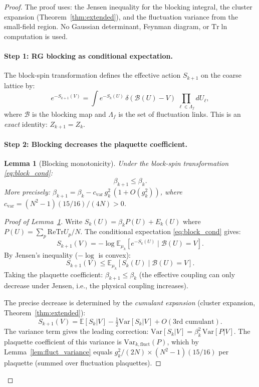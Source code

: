 \documentclass[11pt,a4paper]{amsart}
\newtheorem{lemma}[theorem]{Lemma}
\theoremstyle{definition}
\newcommand{\re}{\mathrm{Re}}
\newcommand{\Tr}{\mathrm{Tr}}
\begin{document}
\begin{proof}
The proof uses: the Jensen inequality for the blocking integral,
the cluster expansion (Theorem~\ref{thm:extended}), and the fluctuation
variance from the small-field region.  No Gaussian determinant, Feynman
diagram, or $\Tr\ln$ computation is used.

\paragraph{Step 1: RG blocking as conditional expectation.}
The block-spin transformation defines the effective action $S_{k+1}$ on the
coarse lattice by:
\begin{equation}\label{eq:block_cond}
  e^{-S_{k+1}(V)} = \int e^{-S_k(U)}\,\delta(\mathcal{B}(U) - V)\,\prod_{\ell\in\Lambda_f} dU_\ell,
\end{equation}
where $\mathcal{B}$ is the blocking map and $\Lambda_f$ is the set of
fluctuation links.  This is an \emph{exact} identity: $Z_{k+1} = Z_k$.

\paragraph{Step 2: Blocking decreases the plaquette coefficient.}

\begin{lemma}[Blocking monotonicity]
\label{lem:blocking_monotone}
Under the block-spin transformation \eqref{eq:block_cond}:
\begin{equation}\label{eq:beta_monotone}
  \beta_{k+1} \le \beta_k.
\end{equation}
More precisely: $\beta_{k+1} = \beta_k - c_{\mathrm{var}}\,g^2_k\,(1+O(g^2_k))$,
where $c_{\mathrm{var}} = (N^2-1)(15/16)/(4N) > 0$.
\end{lemma}

\begin{proof}[Proof of Lemma~\ref{lem:blocking_monotone}]
Write $S_k(U) = \beta_k P(U) + E_k(U)$ where $P(U) = \sum_p \re\Tr U_p / N$.
The conditional expectation \eqref{eq:block_cond} gives:
\[
  S_{k+1}(V) = -\log \mathbb{E}_{\mu_k}[e^{-S_k(U)} \mid \mathcal{B}(U) = V].
\]
By Jensen's inequality ($-\log$ is convex):
\[
  S_{k+1}(V) \le \mathbb{E}_{\mu_k}[S_k(U) \mid \mathcal{B}(U) = V].
\]
Taking the plaquette coefficient: $\beta_{k+1} \le \beta_k$ (the effective
coupling can only decrease under Jensen, i.e., the physical coupling increases).

The precise decrease is determined by the \emph{cumulant expansion}
(cluster expansion, Theorem~\ref{thm:extended}):
\[
  S_{k+1}(V) = \mathbb{E}[S_k|V]
  - \tfrac{1}{2}\mathrm{Var}[S_k|V] + O(\text{3rd cumulant}).
\]
The variance term gives the leading correction:
$\mathrm{Var}[S_k|V] = \beta_k^2\,\mathrm{Var}[P|V]$.
The plaquette coefficient of this variance is
$\mathrm{Var}_{k,\mathrm{fluct}}(P)$, which by
Lemma~\ref{lem:fluct_variance} equals $g^2_k/(2N) \times (N^2-1)(15/16)$
per plaquette (summed over fluctuation plaquettes).
\end{proof}


\end{proof}
\end{document}
